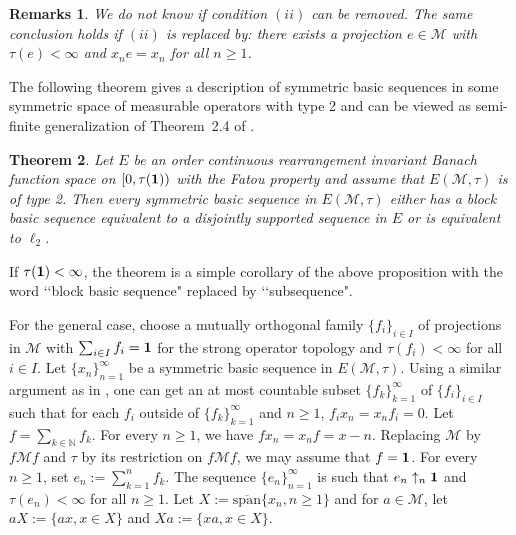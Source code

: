 \documentclass[12pt]{amsart}
\let\cal\mathcal
\newtheorem{theorem}{Theorem}
\newtheorem{remarks}[theorem]{Remarks}
\def\m{{\cal M}}
\numberwithin{equation}{section}
\numberwithin{theorem}{section}
\begin{document}
\begin{remarks}
We do not know if condition $(ii)$ can be removed. The same conclusion
holds if $(ii)$ is replaced by: there exists a projection
$e \in \m$ with $\tau(e)<\infty$ and  $x_ne=x_n$ for all $n\geq 1$.
\end{remarks}

\smallskip

The following theorem gives a description of symmetric basic sequences
in some symmetric space of measurable operators with type 2 and  can be 
viewed as semi-finite generalization of Theorem~2.4 of \cite{SU}.

\begin{theorem}\label{type2}
Let $E$ be an order continuous rearrangement invariant Banach 
function space on $[0,\tau({\bf 1}))$ with the Fatou
property and assume that  
 $E(\cal M, \tau)$ is of type 2. Then 
every symmetric basic sequence in $E(\m,\tau)$ either has a block
basic sequence equivalent to a disjointly supported sequence in $E$ or is
equivalent to $\ell_2$.
\end{theorem}

If $\tau({\bf 1})<\infty$, the theorem is a simple corollary of the above 
proposition with the word \lq\lq{block basic sequence}" replaced by 
\lq\lq{subsequence}".

For the general case,
choose a mutually orthogonal family $\{f_i\}_{i\in I}$
of projections in $\m$
with $\sum_{i\in I} f_i={\bf 1}$ for the strong operator topology and
$\tau(f_i)< \infty$ for all $i\in I$. Let $\{x_n\}_{n=1}^\infty$ be a symmetric 
basic sequence in $E(\m,\tau)$. Using a similar argument as in \cite{X}, one
can get an at most countable subset $\{f_k\}_{k=1}^\infty$ of 
$\{f_i\}_{i\in I}$
such that for each $f_i$ outside of $\{f_k\}_{k=1}^\infty$ and $n\geq 1$,
$f_ix_n=x_nf_i=0$. Let $f=\sum_{k \in\mathbb N} f_k$. For every $n\geq 1$,
we have
$fx_n=x_nf=x-n$. Replacing $\m$ by $f\m f$ and $\tau$ by its restriction on
$f\m f$, we may assume that $f={\bf 1}$. For every $n\geq 1$, set
$e_n:=\sum_{k=1}^n f_k$. The sequence $\{e_n\}_{n=1}^\infty$ is such that $e_n \uparrow_n {\bf 1}$
and $\tau(e_n) <\infty$ for all $n\geq 1$. 
Let $X:=\overline{\text{span}}\{x_n, n\geq 1\}$ and for $a\in \m$, let
$aX:=\{ax, x\in X\}$ and $Xa:=\{xa, x\in X\}$.
\end{document}
